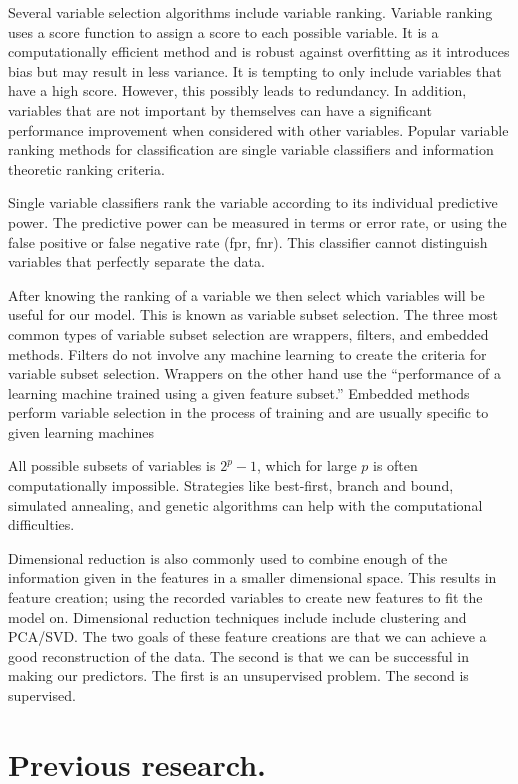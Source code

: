 \documentclass[12pt,twoside]{reedthesis}
\theoremstyle{definition}
\theoremstyle{definition}
\theoremstyle{definition}
\theoremstyle{remark}
\begin{document}
Several variable selection algorithms include variable ranking. Variable
ranking uses a score function to assign a score to each possible
variable. It is a computationally efficient method and is robust against
overfitting as it introduces bias but may result in less variance. It is
tempting to only include variables that have a high score. However, this
possibly leads to redundancy. In addition, variables that are not
important by themselves can have a significant performance improvement
when considered with other variables. Popular variable ranking methods
for classification are single variable classifiers and information
theoretic ranking criteria.

Single variable classifiers rank the variable according to its
individual predictive power. The predictive power can be measured in
terms or error rate, or using the false positive or false negative rate
(fpr, fnr). This classifier cannot distinguish variables that perfectly
separate the data.

After knowing the ranking of a variable we then select which variables
will be useful for our model. This is known as variable subset
selection. The three most common types of variable subset selection are
wrappers, filters, and embedded methods. Filters do not involve any
machine learning to create the criteria for variable subset selection.
Wrappers on the other hand use the ``performance of a learning machine
trained using a given feature subset.'' Embedded methods perform
variable selection in the process of training and are usually specific
to given learning machines

All possible subsets of variables is \(2^p-1\), which for large \(p\) is
often computationally impossible. Strategies like best-first, branch and
bound, simulated annealing, and genetic algorithms can help with the
computational difficulties.

Dimensional reduction is also commonly used to combine enough of the
information given in the features in a smaller dimensional space. This
results in feature creation; using the recorded variables to create new
features to fit the model on. Dimensional reduction techniques include
include clustering and PCA/SVD. The two goals of these feature creations
are that we can achieve a good reconstruction of the data. The second is
that we can be successful in making our predictors. The first is an
unsupervised problem. The second is supervised.

\section{Previous research.}\label{previous-research.}
\end{document}
